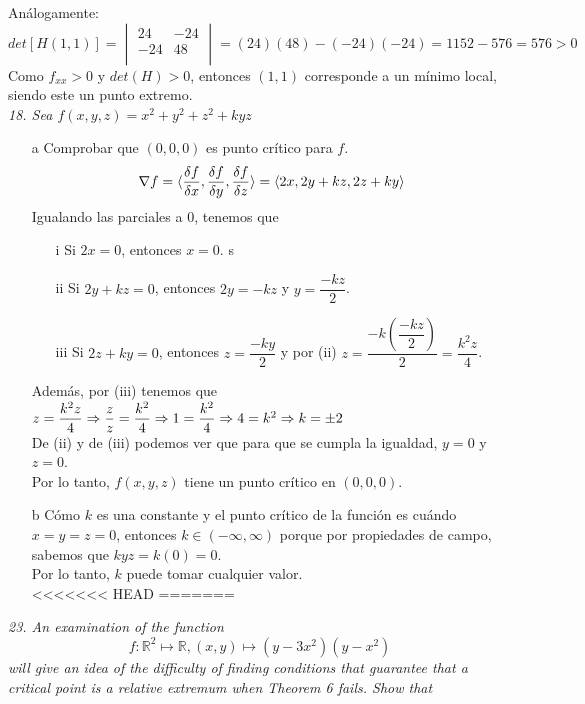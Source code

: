 \documentclass[a4paper,12pt]{article}
\begin{document}
	Análogamente:\\
	$$det [H (1,1)] =
			\begin{vmatrix}
				24 & -24 \\
				-24  & 48 \\
			\end{vmatrix} = (24)(48) -(-24)(-24) = 1152 -576 = 576 > 0
	$$
	Como $f_{xx} > 0$ y $det(H) > 0$, entonces $(1,1)$
	corresponde a un mínimo local, siendo este un punto extremo.\\


\textit{18. Sea $f(x,y,z) = x^2 + y^2 + z^2 + kyz$}
\begin{itemize}
	\item[a] Comprobar que $(0,0,0)$ es punto crítico para $f$.
	$$\nabla f = \langle \dfrac{\delta f}{\delta x}, \dfrac{\delta f}{\delta y}, \dfrac{\delta f}{\delta z}\rangle = \langle 2x, 2y + kz, 2z +ky \rangle$$
	Igualando las parciales a $0$, tenemos que
	\begin{itemize}
		\item[i] Si $2x = 0$, entonces $x = 0$.
	s	\item[ii] Si $2y + kz = 0$, entonces $2y = -kz$ y $y = \dfrac{-kz}{2}$.
		\item[iii] Si $2z + ky = 0$, entonces $z = \dfrac{-ky}{2}$ y por (ii) $z = \dfrac{-k (\dfrac{-kz}{2})}{2} = \dfrac{k^2z}{4}$.
	\end{itemize}
	Además, por (iii) tenemos que $z = \dfrac{k^2z}{4} \Rightarrow \dfrac{z}{z} = \dfrac{k^2}{4} \Rightarrow 1 = \dfrac{k^2}{4} \\ \Rightarrow 4 = k^2 \Rightarrow k = \pm 2$\\
	De (ii) y de (iii) podemos ver que para que se cumpla la igualdad, $y = 0$ y $z = 0$.\\
	Por lo tanto, $f(x,y,z)$ tiene un punto crítico en  $(0,0,0)$.
	\item[b] Cómo $k$ es una constante y el punto crítico de la función es cuándo $x = y = z = 0$, entonces $k \in (-\infty, \infty)$ porque por propiedades de campo, sabemos que $kyz = k(0) = 0$.\\
	Por lo tanto, $k$ puede tomar cualquier valor.\\
<<<<<<< HEAD
=======
\end{itemize}

\textit{23. An examination of the function}
	$$f:\mathbb{R}^2 \mapsto \mathbb{R}, (x, y) \mapsto (y -3x^2)(y -x^2)$$
	\textit{will give an idea of the difficulty of finding conditions that
			guarantee that a critical point is a relative extremum when Theorem
			6 fails. Show that}\\
\end{document}
